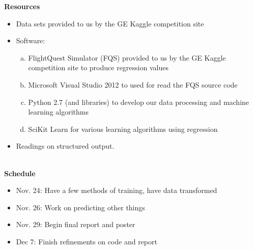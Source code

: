 \documentclass{article}[9pt]
\begin{document}
\noindent
\Large{\textbf{Resources}}
\begin{itemize}
	\item Data sets provided to us by the GE Kaggle competition site
	\item Software: 
		\begin{enumerate}[(a)]
			\item FlightQuest Simulator (FQS) provided to us by the GE Kaggle competition site to produce regression values
			\item Microsoft Visual Studio 2012 to used for read the FQS source code
			\item Python 2.7 (and libraries) to develop our data processing and machine learning algorithms
			\item SciKit Learn for various learning algorithms using regression
		\end{enumerate}
	\item Readings on structured output. 
\end{itemize}
\hspace*{\fill}\\
\Large{\textbf{Schedule}}
\noindent
\begin{itemize}
	\item Nov. 24: Have a few methods of training, have data transformed
	\item Nov. 26: Work on predicting other things
	\item Nov. 29: Begin final report and poster
	\item Dec 7: Finish refinements on code and report 
\end{itemize}
\end{document}
